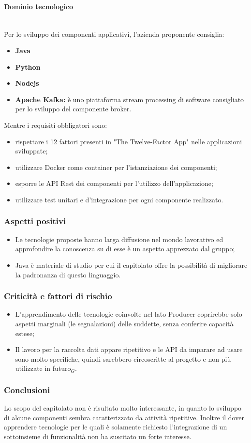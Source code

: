 \paragraph{Dominio tecnologico}\mbox{}\\
Per lo sviluppo dei componenti applicativi, l'azienda proponente consiglia:
\begin{itemize}
	\item \textbf{Java}
	\item \textbf{Python}
	\item \textbf{Nodejs}
	\item \textbf{Apache Kafka:} è uno piattaforma stream processing di software consigliato per lo sviluppo del componente broker.
\end{itemize}
Mentre i requisiti obbligatori sono:
\begin{itemize}
	\item rispettare i 12 fattori presenti in "The Twelve-Factor App" nelle applicazioni sviluppate;
	\item utilizzare Docker come container per l'istanziazione dei componenti;
	\item esporre le API Rest dei componenti per l'utilizzo dell'applicazione; 
	\item utilizzare test unitari e d'integrazione per ogni componente realizzato.
\end{itemize}
\subsubsection{Aspetti positivi}
\begin{itemize}
	\item Le tecnologie proposte hanno larga diffusione nel mondo lavorativo ed approfondire la conoscenza su di esse è un aspetto apprezzato dal gruppo;
	\item Java è materiale di studio per cui il capitolato offre la possibilità di migliorare la padronanza di questo linguaggio.
\end{itemize}
\subsubsection{Criticità e fattori di rischio}
\begin{itemize}
	\item L'apprendimento delle tecnologie coinvolte nel lato Producer coprirebbe solo aspetti marginali (le segnalazioni) delle suddette, senza conferire capacità estese;
	\item Il lavoro per la raccolta dati appare ripetitivo e le API da imparare ad usare sono molto specifiche, quindi sarebbero circoscritte al progetto e non più utilizzate in futuro$_{G}$. 
	
\end{itemize}
\subsubsection{Conclusioni}
Lo scopo del capitolato non è risultato molto interessante, in quanto lo sviluppo di alcune componenti sembra caratterizzato da attività ripetitive. Inoltre il dover apprendere tecnologie per le quali è solamente richiesto l'integrazione di un sottoinsieme di funzionalità non ha suscitato un forte interesse.